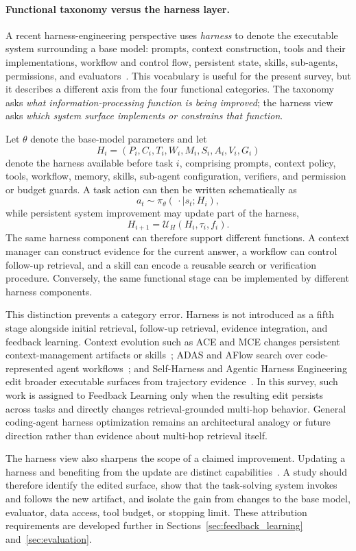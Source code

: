 \paragraph{Functional taxonomy versus the harness layer.}
A recent harness-engineering perspective uses \emph{harness} to denote the executable system surrounding a base model: prompts, context construction, tools and their implementations, workflow and control flow, persistent state, skills, sub-agents, permissions, and evaluators~\cite{weng2026harness}. This vocabulary is useful for the present survey, but it describes a different axis from the four functional categories. The taxonomy asks \emph{what information-processing function is being improved}; the harness view asks \emph{which system surface implements or constrains that function}.

Let $\theta$ denote the base-model parameters and let
\[
H_i=(P_i,C_i,T_i,W_i,M_i,S_i,A_i,V_i,G_i)
\]
denote the harness available before task $i$, comprising prompts, context policy, tools, workflow, memory, skills, sub-agent configuration, verifiers, and permission or budget guards. A task action can then be written schematically as
\[
a_t\sim \pi_{\theta}(\,\cdot\mid s_t;H_i),
\]
while persistent system improvement may update part of the harness,
\[
H_{i+1}=\mathcal{U}_H(H_i,\tau_i,f_i).
\]
The same harness component can therefore support different functions. A context manager can construct evidence for the current answer, a workflow can control follow-up retrieval, and a skill can encode a reusable search or verification procedure. Conversely, the same functional stage can be implemented by different harness components.

This distinction prevents a category error. Harness is not introduced as a fifth stage alongside initial retrieval, follow-up retrieval, evidence integration, and feedback learning. Context evolution such as ACE and MCE changes persistent context-management artifacts or skills~\cite{zhang2026ace,ye2026mce}; ADAS and AFlow search over code-represented agent workflows~\cite{hu2025adas,zhang2025aflow}; and Self-Harness and Agentic Harness Engineering edit broader executable surfaces from trajectory evidence~\cite{zhang2026selfharness,lin2026ahe}. In this survey, such work is assigned to Feedback Learning only when the resulting edit persists across tasks and directly changes retrieval-grounded multi-hop behavior. General coding-agent harness optimization remains an architectural analogy or future direction rather than evidence about multi-hop retrieval itself.

The harness view also sharpens the scope of a claimed improvement. Updating a harness and benefiting from the update are distinct capabilities~\cite{lin2026harnessbenefit}. A study should therefore identify the edited surface, show that the task-solving system invokes and follows the new artifact, and isolate the gain from changes to the base model, evaluator, data access, tool budget, or stopping limit. These attribution requirements are developed further in Sections~\ref{sec:feedback_learning} and~\ref{sec:evaluation}.
